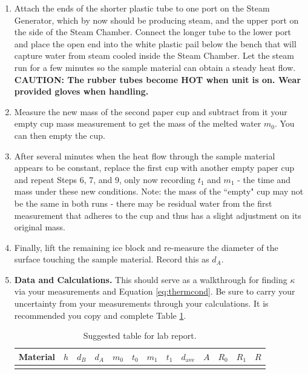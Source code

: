 \begin{enumerate}
	\item Attach the ends of the shorter plastic tube to one port on the Steam Generator, which by now should be producing steam, and the upper port on the side of the Steam Chamber.  Connect the longer tube to the lower port and place the open end into the white plastic pail below the bench that will capture water from steam cooled inside the Steam Chamber.  Let the steam run for a few minutes so the sample material can obtain a steady heat flow.  \textbf{CAUTION: The rubber tubes become HOT when unit is on.  Wear provided gloves when handling.}
	\item Measure the new mass of the second paper cup and subtract from it your empty cup mass measurement to get the mass of the melted water $m_{0}$.  You can then empty the cup.
	\item After several minutes when the heat flow through the sample material appears to be constant, replace the first cup with another empty paper cup and repeat Steps 6, 7, and 9, only now recording $t_{1}$ and $m_{1}$ - the time and mass under these new conditions.  Note: the mass of the ``empty" cup may not be the same in both runs - there may be residual water from the first measurement that adheres to the cup and thus has a slight adjustment on its original mass.
	\item Finally, lift the remaining ice block and re-measure the diameter of the surface touching the sample material.  Record this as $d_A$.
	\item \textbf{Data and Calculations.}  This should serve as a walkthrough for finding $\kappa$ via your measurements and Equation \ref{eq:thermcond}.  Be sure to carry your uncertainty from your measurements through your calculations.  It is recommended you copy and complete Table \ref{vchart}.
	\begin{table}
	\begin{center}
	\begin{tabular}{| c | c| c | c | c | c | c | c || c | c | c | c | c |}
	\hline
	Material & $h$ & $d_B$ & $d_A$& $m_{0}$ & $t_{0}$ & $m_{1}$ & $t_{1}$ & $d_\text{ave}$ & $A$ & $R_{0}$ & $R_{1}$ & $R$ \\
	\hline
	& & & & & & & & & & & &   \\
	\hline
	\end{tabular}
	\end{center}
	\vspace{-0.5 cm}
	\caption{Suggested table for lab report.}
	\label{vchart}
	\end{table}
	\begin{enumerate}

\end{enumerate}
\end{enumerate}
